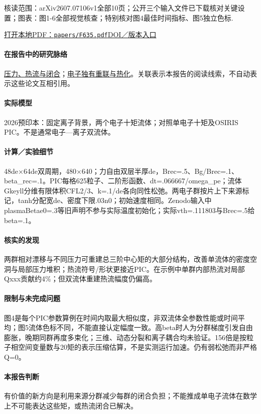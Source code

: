 \textsf{核读范围：}arXiv2607.07106v1全部10页；公开三个输入文件已下载核对关键设置；\textsf{图表：}图1-6全部视觉核查；特别核对图4最佳时间指标、图5独立色标.

\href{run:papers/F635.pdf}{打开本地PDF：\texttt{papers/F635.pdf}}\quad\href{https://doi.org/10.48550/arxiv.2607.07106}{DOI／版本入口}

\paragraph{在报告中的研究脉络}\hyperref[story:closure]{压力、热流与闭合}；\hyperref[story:energy]{电子独有重联与热化}。关联表示本报告的阅读线索，不自动表示这些论文互相引用。

\paragraph{实际模型}2026预印本：固定离子背景，两个电子十矩流体；对照单电子十矩及OSIRIS PIC。不是通常电子—离子双流体。

\paragraph{计算／实验细节}48de×64de双周期，480×640；力自由双层半厚de，Brec=.5、Bg/Brec=.1、beta\_rec=.1。PIC每格625粒子、二阶形函数、dt=.066667/omega\_pe；流体Gkeyll分维有限体积CFL2/3、k=.1/de各向同性松弛。两电子群按片上下来源标记，tanh分配宽de、密度下限.03n0；初始速度相同。Zenodo输入中plasmaBetae0=.3等旧声明不参与实际温度初始化；实际vth=.111803与Brec=.5给beta=.1。

\paragraph{核实的发现}两群相对漂移与不同压力可重建总三阶中心矩的大部分结构，改善单流体的密度空洞与局部压力堆积；热流符号/形状更接近PIC。在示例中单群内部热流对局部Qxxx贡献约4\%；但双流体重建热流幅度仍偏高。

\paragraph{限制与未完成问题}图4是每个PIC参数算例在时间内取最大相似度，非双流体全参数性能或时间平均；图5流体色标不同，不能直接认定幅度一致。高beta时人为分群梯度引发自由膨胀，晚期同群再度多束化；三维、动态分裂和离子耦合均未验证。156倍是按粒子相空间变量数与20矩的表示压缩估算，不是实测运行加速。仍有弱松弛而非严格Q=0。

\paragraph{本报告判断}有价值的新方向是利用来源分群减少每群的闭合负担；不能推成单电子流体在数学上不可能表达这些矩，或热流闭合已解决。

